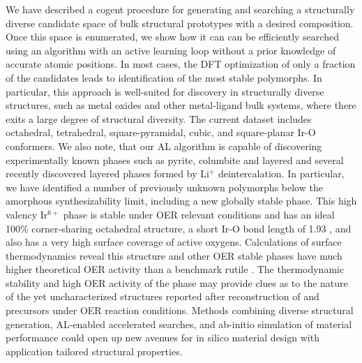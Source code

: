 


%
We have described a cogent procedure for generating and searching a structurally diverse candidate space of bulk structural prototypes with a desired composition.
%
Once this space is enumerated, we show how it can can be efficiently searched using an algorithm with an active learning loop without a prior knowledge of accurate atomic positions.
%
In most cases, the DFT optimization of only a fraction of the candidates leads to identification of the most stable polymorphs.
%
In particular, this approach is well-suited for discovery in structurally diverse structures, such as metal oxides and other metal-ligand bulk systems, where there exits a large degree of structural diversity.
%
The current dataset includes octahedral, tetrahedral, square-pyramidal, cubic, and square-planar Ir-O conformers.
%
We also note, that our AL algorithm is capable of discovering experimentally known phases such as pyrite, columbite and layered \IrOtwo and several recently discovered layered \IrOthree phases formed by Li$^+$ deintercalation.
%
In particular, we have identified a number of previously unknown \IrOthree polymorphs below the amorphous synthesizability limit,
including a new globally stable \aIrOthree phase.
%
This high valency Ir$^{6+}$ phase is stable under OER relevant conditions and has an ideal 100\% corner-sharing octahedral structure, a short Ir-O bond length of 1.93 \angstrom, and also has a very high surface coverage of active oxygens.
%
Calculations of surface thermodynamics reveal this structure and other OER stable \IrOthree phases have much higher theoretical OER activity than a benchmark rutile \IrOtwo.
%
The thermodynamic stability and high OER activity of the \aIrOthree phase may provide clues as to the nature of the yet uncharacterized structures reported after reconstruction of  and \IrOx precursors under OER reaction conditions.
%
Methods combining diverse structural generation, AL-enabled accelerated searches, and \mbox{ab-initio} simulation of material performance could open up new avenues for in silico material design with application tailored structural properties.







